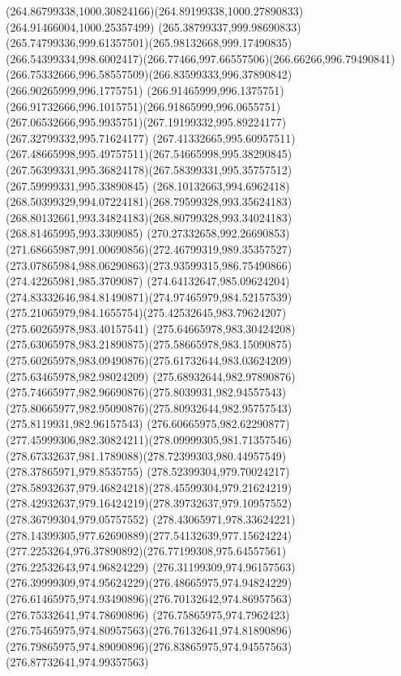 {    \curveto(264.86799338,1000.30824166)(264.89199338,1000.27890833)(264.91466004,1000.25357499)
    \curveto(265.38799337,999.98690833)(265.74799336,999.61357501)(265.98132668,999.17490835)
    \curveto(266.54399334,998.6002417)(266.77466,997.66557506)(266.66266,996.79490841)
    \curveto(266.75332666,996.58557509)(266.83599333,996.37890842)(266.90265999,996.1775751)
    \curveto(266.91465999,996.1375751)(266.91732666,996.1015751)(266.91865999,996.0655751)
    \curveto(267.06532666,995.9935751)(267.19199332,995.89224177)(267.32799332,995.71624177)
    \curveto(267.41332665,995.60957511)(267.48665998,995.49757511)(267.54665998,995.38290845)
    \curveto(267.56399331,995.36824178)(267.58399331,995.35757512)(267.59999331,995.33890845)
    \curveto(268.10132663,994.6962418)(268.50399329,994.07224181)(268.79599328,993.35624183)
    \curveto(268.80132661,993.34824183)(268.80799328,993.34024183)(268.81465995,993.3309085)
    \curveto(270.27332658,992.26690853)(271.68665987,991.00690856)(272.46799319,989.35357527)
    \curveto(273.07865984,988.06290863)(273.93599315,986.75490866)(274.42265981,985.3709087)
    \curveto(274.64132647,985.09624204)(274.83332646,984.81490871)(274.97465979,984.52157539)
    \curveto(275.21065979,984.1655754)(275.42532645,983.79624207)(275.60265978,983.40157541)
    \curveto(275.64665978,983.30424208)(275.63065978,983.21890875)(275.58665978,983.15090875)
    \curveto(275.60265978,983.09490876)(275.61732644,983.03624209)(275.63465978,982.98024209)
    \curveto(275.68932644,982.97890876)(275.74665977,982.96690876)(275.8039931,982.94557543)
    \curveto(275.80665977,982.95090876)(275.80932644,982.95757543)(275.8119931,982.96157543)
    \curveto(276.60665975,982.62290877)(277.45999306,982.30824211)(278.09999305,981.71357546)
    \curveto(278.67332637,981.1789088)(278.72399303,980.44957549)(278.37865971,979.8535755)
    \curveto(278.52399304,979.70024217)(278.58932637,979.46824218)(278.45599304,979.21624219)
    \curveto(278.42932637,979.16424219)(278.39732637,979.10957552)(278.36799304,979.05757552)
    \curveto(278.43065971,978.33624221)(278.14399305,977.62690889)(277.54132639,977.15624224)
    \curveto(277.2253264,976.37890892)(276.77199308,975.64557561)(276.22532643,974.96824229)
    \curveto(276.31199309,974.96157563)(276.39999309,974.95624229)(276.48665975,974.94824229)
    \curveto(276.61465975,974.93490896)(276.70132642,974.86957563)(276.75332641,974.78690896)
    \curveto(276.75865975,974.7962423)(276.75465975,974.80957563)(276.76132641,974.81890896)
    \curveto(276.79865975,974.89090896)(276.83865975,974.94557563)(276.87732641,974.99357563)
}
